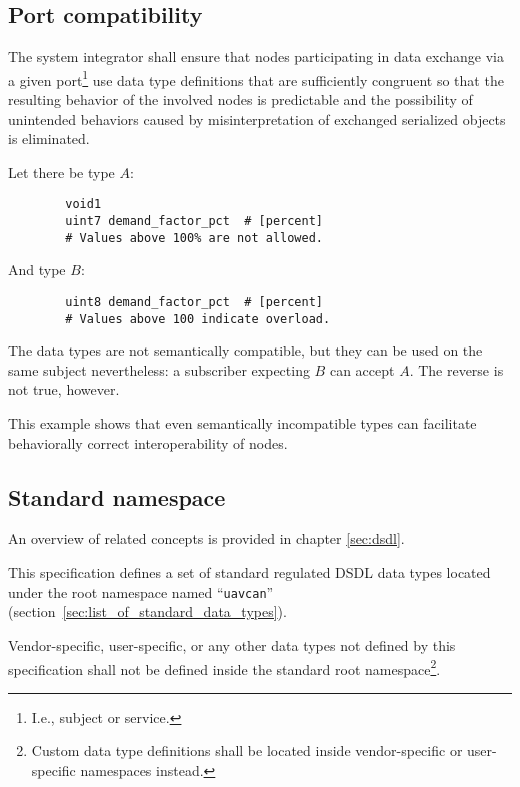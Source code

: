 \subsection{Port compatibility}


The system integrator shall ensure that nodes participating in data exchange via a given port\footnote{%
    I.e., subject or service.
} use data type definitions that are sufficiently congruent so that the resulting behavior of the involved nodes
is predictable and the possibility of unintended behaviors caused by misinterpretation of exchanged serialized
objects is eliminated.

\begin{remark}
    Let there be type $A$:

    \begin{verbatim}
        void1
        uint7 demand_factor_pct  # [percent]
        # Values above 100% are not allowed.
    \end{verbatim}

    And type $B$:

    \begin{verbatim}
        uint8 demand_factor_pct  # [percent]
        # Values above 100 indicate overload.
    \end{verbatim}

    The data types are not semantically compatible, but they can be used on the same subject nevertheless:
    a subscriber expecting $B$ can accept $A$.
    The reverse is not true, however.

    This example shows that even semantically incompatible types can facilitate
    behaviorally correct interoperability of nodes.
\end{remark}

\subsection{Standard namespace}

An overview of related concepts is provided in chapter \ref{sec:dsdl}.

This specification defines a set of standard regulated DSDL data types located under
the root namespace named ``\verb"uavcan"'' (section~\ref{sec:list_of_standard_data_types}).

Vendor-specific, user-specific, or any other data types not defined by this specification
shall not be defined inside the standard root namespace\footnote{Custom data type definitions shall be located
inside vendor-specific or user-specific namespaces instead.}.
